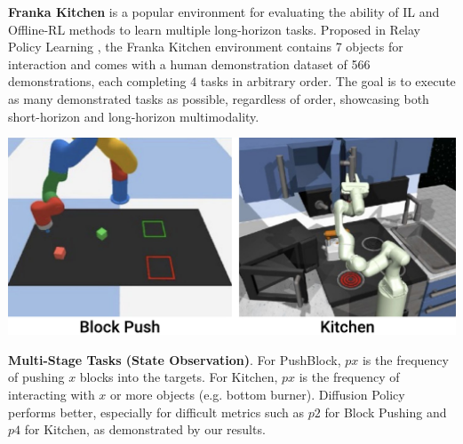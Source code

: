 \textbf{Franka Kitchen} is a popular environment for evaluating the ability of IL and Offline-RL methods to learn multiple long-horizon tasks. Proposed in Relay Policy Learning \cite{gupta2019relay}, the Franka Kitchen environment contains 7 objects for interaction and comes with a human demonstration dataset of 566 demonstrations, each completing 4 tasks in arbitrary order. The goal is to execute as many demonstrated tasks as possible, regardless of order, showcasing both short-horizon and long-horizon multimodality.

\begin{table}[t]
\centering
\includegraphics[width=0.9\linewidth]{figure/multitask_thumbnails.pdf}

\vspace{2mm}

\caption{\textbf{Multi-Stage Tasks (State Observation)}.
\label{tab:multi_stage}
For PushBlock, $px$ is the frequency of pushing $x$ blocks into the targets.
For Kitchen, $px$ is the frequency of interacting with $x$ or more objects (e.g. bottom burner).
Diffusion Policy performs better, especially for difficult metrics such as $p2$ for Block Pushing and $p4$ for Kitchen, as demonstrated by our results.
}
\vspace{-4mm}
\end{table}

